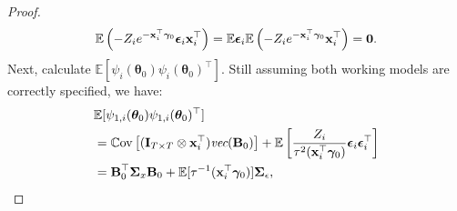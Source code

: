 \documentclass[12pt, A4]{article}
\newcommand{\ObsCov}{\textbf{x}_i}
\newcommand{\LogCoe}{\boldsymbol{\gamma}}
\newcommand{\vect}{\emph{vec}}
\newcommand{\IdenMat}{\textbf{I}}
\newcommand{\Cov}{\mathbb{C}\text{ov}}
\begin{document}
\begin{proof}
            \begin{equation*}
                \mathbb{E} \left( -Z_i e^{-\ObsCov^{\top} \LogCoe_0} \boldsymbol{\epsilon}_i \ObsCov^{\top} \right) = \mathbb{E}\boldsymbol{\epsilon}_i \mathbb{E}\left( -Z_i e^{-\ObsCov^{\top} \LogCoe_0} \ObsCov^{\top} \right) = \textbf{0}. \\
            \end{equation*}    
        Next, calculate $\mathbb{E} [ \psi_i(\boldsymbol{\theta}_0)\psi_i(\boldsymbol{\theta}_0)^{\top} ] $.
        Still assuming both working models are correctly specified, we have: 
            \begin{align*}
                &\mathbb{E} [ \psi_{1,i}(\boldsymbol{\theta}_0) \psi_{1,i}(\boldsymbol{\theta}_0)^{\top} ] \\ 
                &= \Cov\left[ (\IdenMat_{T \times T} \otimes \ObsCov^{\top})\vect(\textbf{B}_0) \right] + \mathbb{E} \left[ \frac{Z_i}{\tau^2(\ObsCov^{\top}\LogCoe_0)} \boldsymbol{\epsilon}_i\boldsymbol{\epsilon}_i^{\top} \right] \\
                &= \textbf{B}^{\top}_0 \boldsymbol{\Sigma}_{x} \textbf{B}_0 + \mathbb{E} [\tau^{-1}(\ObsCov^{\top}\LogCoe_0)] \boldsymbol{\Sigma}_{\epsilon},
            \end{align*}

\end{proof}
\end{document}
